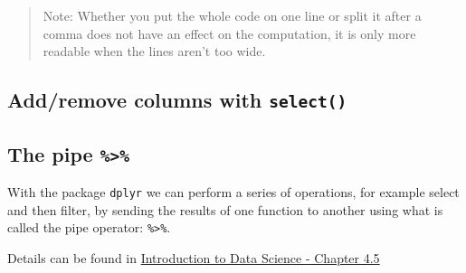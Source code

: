 \documentclass[
]{book}
\newenvironment{Shaded}{\begin{snugshade}}{\end{snugshade}}
\newcommand{\CommentTok}[1]{\textcolor[rgb]{0.56,0.35,0.01}{\textit{#1}}}
\newcommand{\DataTypeTok}[1]{\textcolor[rgb]{0.13,0.29,0.53}{#1}}
\newcommand{\DecValTok}[1]{\textcolor[rgb]{0.00,0.00,0.81}{#1}}
\newcommand{\FloatTok}[1]{\textcolor[rgb]{0.00,0.00,0.81}{#1}}
\newcommand{\KeywordTok}[1]{\textcolor[rgb]{0.13,0.29,0.53}{\textbf{#1}}}
\newcommand{\NormalTok}[1]{#1}
\newcommand{\OperatorTok}[1]{\textcolor[rgb]{0.81,0.36,0.00}{\textbf{#1}}}
\newcommand{\StringTok}[1]{\textcolor[rgb]{0.31,0.60,0.02}{#1}}
\let\oldShaded\Shaded
\let\endoldShaded\endShaded
\renewenvironment{Shaded}{\footnotesize\oldShaded}{\endoldShaded}
\begin{document}
\begin{quote}
Note: Whether you put the whole code on one line or split it after a comma does not have an effect on the computation, it is only more readable when the lines aren't too wide.
\end{quote}

\hypertarget{addremove-columns-with-select}{%
\subsection{\texorpdfstring{Add/remove columns with \texttt{select()}}{Add/remove columns with select()}}\label{addremove-columns-with-select}}

\begin{Shaded}
\end{Shaded}

\hypertarget{the-pipe}{%
\subsection{\texorpdfstring{The pipe \texttt{\%\textgreater{}\%}}{The pipe \%\textgreater\%}}\label{the-pipe}}

With the package \texttt{dplyr} we can perform a series of operations, for example select and then filter, by sending the results of one function to another using what is called the pipe operator: \texttt{\%\textgreater{}\%}.

Details can be found in \href{https://rafalab.github.io/dsbook/tidyverse.html}{Introduction to Data Science - Chapter 4.5}
\end{document}
